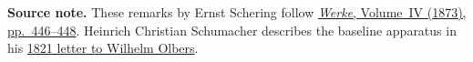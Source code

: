 \par\medskip\begin{small}\noindent\textbf{Source note.} These remarks by Ernst Schering follow \href{https://gdz.sub.uni-goettingen.de/download/pdf/PPN236005081/LOG_0046.pdf}{\textit{Werke}, Volume~IV (1873), pp.~446--448}. Heinrich Christian Schumacher describes the baseline apparatus in his \href{https://doi.org/10.3931/e-rara-111723}{1821 letter to Wilhelm Olbers}.\par\end{small}

